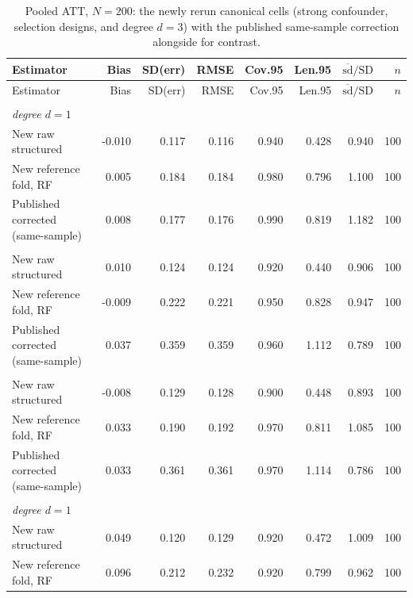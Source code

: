 {\footnotesize
\begin{longtable}{lrrrrrrr}
\caption{Pooled ATT, $N=200$: the newly rerun canonical cells (strong confounder, selection designs, and degree $d=3$) with the published same-sample correction alongside for contrast.}\label{tab:completion_b1}\\
\toprule
Estimator & Bias & SD(err) & RMSE & Cov.95 & Len.95 & $\overline{\mathrm{sd}}/\mathrm{SD}$ & $n$ \\
\midrule
\endfirsthead
Estimator & Bias & SD(err) & RMSE & Cov.95 & Len.95 & $\overline{\mathrm{sd}}/\mathrm{SD}$ & $n$ \\
\midrule
\endhead
\bottomrule
\endlastfoot
\multicolumn{8}{l}{\textit{strong\_confounder}} \\
\multicolumn{8}{l}{\textit{degree $d=1$}} \\
\quad New raw structured & -0.010 & 0.117 & 0.116 & 0.940 & 0.428 & 0.940 & 100 \\
\quad New reference fold, RF & 0.005 & 0.184 & 0.184 & 0.980 & 0.796 & 1.100 & 100 \\
\quad Published corrected (same-sample) & 0.008 & 0.177 & 0.176 & 0.990 & 0.819 & 1.182 & 100 \\
\addlinespace
\multicolumn{8}{l}{\textit{degree $d=2$}} \\
\quad New raw structured & 0.010 & 0.124 & 0.124 & 0.920 & 0.440 & 0.906 & 100 \\
\quad New reference fold, RF & -0.009 & 0.222 & 0.221 & 0.950 & 0.828 & 0.947 & 100 \\
\quad Published corrected (same-sample) & 0.037 & 0.359 & 0.359 & 0.960 & 1.112 & 0.789 & 100 \\
\addlinespace
\multicolumn{8}{l}{\textit{degree $d=3$}} \\
\quad New raw structured & -0.008 & 0.129 & 0.128 & 0.900 & 0.448 & 0.893 & 100 \\
\quad New reference fold, RF & 0.033 & 0.190 & 0.192 & 0.970 & 0.811 & 1.085 & 100 \\
\quad Published corrected (same-sample) & 0.033 & 0.361 & 0.361 & 0.970 & 1.114 & 0.786 & 100 \\
\addlinespace
\multicolumn{8}{l}{\textit{selection\_obs}} \\
\multicolumn{8}{l}{\textit{degree $d=1$}} \\
\quad New raw structured & 0.049 & 0.120 & 0.129 & 0.920 & 0.472 & 1.009 & 100 \\
\quad New reference fold, RF & 0.096 & 0.212 & 0.232 & 0.920 & 0.799 & 0.962 & 100 \\

\end{longtable}}
